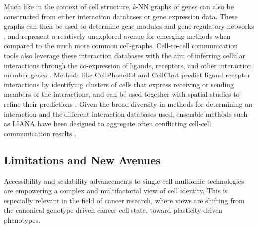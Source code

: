Much like in the context of cell structure, \emph{k}-NN graphs of genes can also be constructed from either interaction databases or gene expression data. These graphs can then be used to determine gene modules and gene regulatory networks \cite{aibar_scenic_2017}, and represent a relatively unexplored avenue for emerging methods when compared to the much more common cell-graphs.
Cell-to-cell communication tools also leverage these interaction databases with the aim of inferring cellular interactions through the co-expression of ligands, receptors, and other interaction member genes \cite{armingol_deciphering_2020}. Methods like CellPhoneDB \cite{efremova_cellphonedb_2020} and CellChat \cite{jin_inference_2021} predict ligand-receptor interactions by identifying clusters of cells that express receiving or sending members of the interactions, and can be used together with spatial studies to refine their predictions \cite{hu_cytotalk_2021,kanemaru_spatially_2023}. Given the broad diversity in methods for determining an interaction and the different interaction databases used, ensemble methods such as LIANA have been designed to aggregate often conflicting cell-cell communication results \cite{dimitrov_comparison_2022, baghdassarian_combining_2023}. 


\subsection{Limitations and New Avenues}

Accessibility and scalability advancements to single-cell multiomic technologies are empowering a complex and multifactorial view of cell identity. This is especially relevant in the field of cancer research, where views are shifting from the canonical genotype-driven cancer cell state, toward plasticity-driven phenotypes. 

